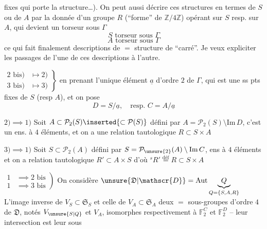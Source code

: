 fixes qui porte la structure\ldots). On peut aussi décrire ces structures en termes de $S$ ou de $A$ par la donnée d'un groupe $R$ (``forme'' de $\mathbb{Z}/4\mathbb{Z}$) opérant sur $S$ resp. sur $A$, qui devient un torseur sous $\Gamma$
\[
 S\text{ torseur sous }\Gamma\tag*{(2 bis)}
\]
\[
 A\text{ torseur sous }\Gamma\tag*{(3 bis)}
\]
ce qui fait finalement   descriptions de  $=$ structure de ``carré''. Je veux expliciter les passages de l'une de ces descriptions à l'autre.

$\left.\begin{aligned}2\text{ bis})&\longmapsto2)\\3\text{ bis})&\longmapsto3)\end{aligned}\right\}$
en prenant l'unique élément $\underline a$ d'ordre $2$ de $\Gamma$, qui est une  ss pts fixes de $S$ (resp $A$), et on pose
\[
D=S/\underline a,\quad\text{resp. }C=A/\underline a
\]

$2)$$\implies1)$ \quad Soit $A\subset\mathcal{P}_2(S)\inserted{\subset\mathcal{P}(S)}$ défini par $A=\mathcal{P}_2(S)\setminus\mathrm{Im}\,D$, c'est un ens. à $4$ éléments,  et on a une relation tautologique $R\subset S\times A$

$3)\implies1)$ \quad Soit $S\subset\mathcal{P}_2(A)$ défini par $S=\mathcal{P}_{\unsure{2}}(A)\setminus\mathrm{Im}\,C$, ens à $4$ éléments et on a relation tautologique $R'\subset A\times S$ d'où $ {}^{s}R'\stackrel{\mathrm{déf}}{=}R\subset S\times A$

$\left.\begin{aligned}1&\implies2\text{ bis}\\1&\implies3\text{ bis}\end{aligned}\right)$
On considère $\unsure{\mathfrak{D}|\mathscr{D}}=\mathrm{Aut}\underbrace{Q}_{Q=\{S,A,R\}}$
   
L'image inverse de $V_S\subset\mathfrak{S}_S$ et celle de $V_A\subset\mathfrak{S}_A$  deux $=$ sous-groupes d'ordre $4$  de $\mathfrak{D}$, notés $V_{\unsure{S|Q}}$ et $V_A$, isomorphes respectivement à $\mathbb{F}_2^C$ et $\mathbb{F}_2^D$ -- leur intersection est leur sous

